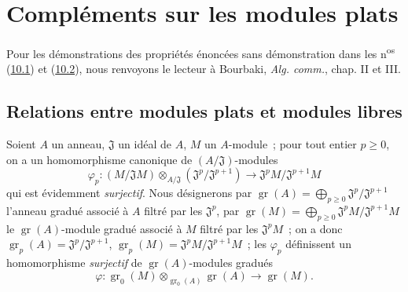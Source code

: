 \section{Compléments sur les modules plats}
\label{section:0.10-fr}

Pour les démonstrations des propriétés énoncées sans démonstration dans les
n\textsuperscript{os} (\hyperref[subsection:0.10.1-fr]{10.1}) et
(\hyperref[subsection:0.10.2-fr]{10.2}), nous renvoyons le lecteur à Bourbaki,
\emph{Alg. comm.}, chap. II et III.

\subsection{Relations entre modules plats et modules libres}
\label{subsection:0.10.1-fr}

\begin{env}[10.1.1]
\label{0.10.1.1-fr}
Soient $A$ un anneau, $\mathfrak{J}$ un idéal de $A$, $M$ un $A$-module~; pour
tout entier $p\geq0$, on a un homomorphisme canonique de
$(A/\mathfrak{J})$-modules
\[
\label{0.10.1.1.1-fr}
  \varphi_p:(M/\mathfrak{J}M)\otimes_{A/\mathfrak{J}}
  (\mathfrak{J}^p/\mathfrak{J}^{p+1})
  \longrightarrow \mathfrak{J}^pM/\mathfrak{J}^{p+1}M
  \tag{10.1.1.1}
\]
qui est évidemment \emph{surjectif}. Nous désignerons par
$\operatorname{gr}(A)=\bigoplus_{p\geq0}\mathfrak{J}^p/\mathfrak{J}^{p+1}$ l'anneau gradué
associé à $A$ filtré par les $\mathfrak{J}^p$, par
$\operatorname{gr}(M)=\bigoplus_{p\geq0}\mathfrak{J}^pM/\mathfrak{J}^{p+1}M$ le
$\operatorname{gr}(A)$-module gradué associé à $M$ filtré par les $\mathfrak{J}^pM$~; on a
donc $\operatorname{gr}_p(A)=\mathfrak{J}^p/\mathfrak{J}^{p+1}$,
$\operatorname{gr}_p(M)=\mathfrak{J}^pM/\mathfrak{J}^{p+1}M$~; les $\varphi_p$ définissent
un homomorphisme \emph{surjectif} de $\operatorname{gr}(A)$-modules gradués
\[
\label{0.10.1.1.2-fr}
  \varphi:\operatorname{gr}_0(M)\otimes_{\operatorname{gr}_0(A)}
  \operatorname{gr}(A)\longrightarrow\operatorname{gr}(M).
  \tag{10.1.1.2}
\]
\end{env}

